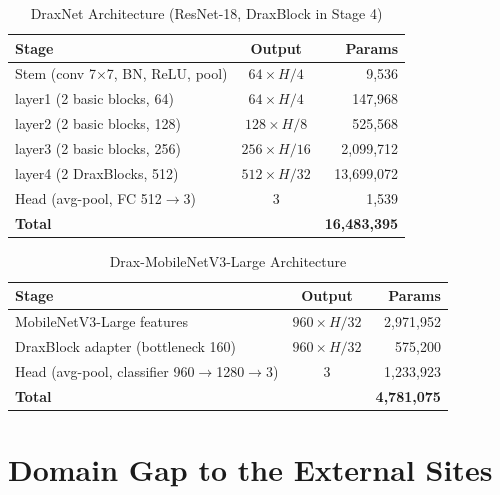 \documentclass[conference, letterpaper]{IEEEtran}
\begin{document}
\begin{table}[!ht]
\renewcommand{\arraystretch}{1.2}
\centering
\begin{threeparttable}
\caption{DraxNet Architecture (ResNet-18, DraxBlock in Stage 4)}
\label{tab:arch_draxnet}
\footnotesize
\begin{tabularx}{\columnwidth}{@{}X c r@{}}
\toprule
\textbf{Stage} & \textbf{Output} & \textbf{Params} \\
\midrule
Stem (conv 7$\times$7, BN, ReLU, pool) & $64\times H/4$ & 9,536 \\
layer1 (2 basic blocks, 64) & $64\times H/4$ & 147,968 \\
layer2 (2 basic blocks, 128) & $128\times H/8$ & 525,568 \\
layer3 (2 basic blocks, 256) & $256\times H/16$ & 2,099,712 \\
layer4 (2 DraxBlocks, 512) & $512\times H/32$ & 13,699,072 \\
Head (avg-pool, FC 512$\to$3) & 3 & 1,539 \\
\midrule
\textbf{Total} & & \textbf{16,483,395} \\
\bottomrule
\end{tabularx}
\end{threeparttable}
\end{table}

\begin{table}[!ht]
\renewcommand{\arraystretch}{1.2}
\centering
\begin{threeparttable}
\caption{Drax-MobileNetV3-Large Architecture}
\label{tab:arch_draxmobilenet}
\footnotesize
\begin{tabularx}{\columnwidth}{@{}X c r@{}}
\toprule
\textbf{Stage} & \textbf{Output} & \textbf{Params} \\
\midrule
MobileNetV3-Large features & $960\times H/32$ & 2,971,952 \\
DraxBlock adapter (bottleneck 160) & $960\times H/32$ & 575,200 \\
Head (avg-pool, classifier 960$\to$1280$\to$3) & 3 & 1,233,923 \\
\midrule
\textbf{Total} & & \textbf{4,781,075} \\
\bottomrule
\end{tabularx}
\end{threeparttable}
\end{table}

\section{Domain Gap to the External Sites}
\label{app:domain_gap}
\end{document}
